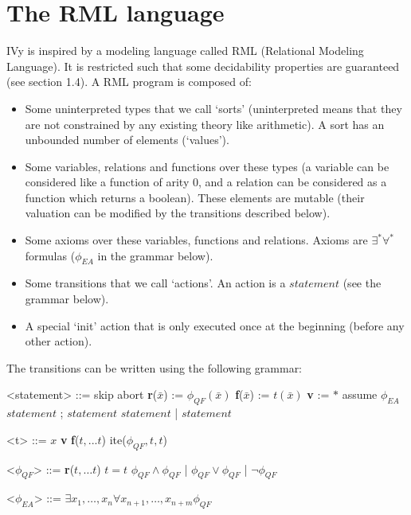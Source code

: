 \documentclass[11pt,a4paper,oldfontcommands]{memoir}
\begin{document}
    \section{The RML language}

    IVy is inspired by a modeling language called RML (Relational Modeling Language). It is restricted such that some decidability properties are guaranteed (see section 1.4).
    A RML program is composed of:
    \begin{itemize}
        \item Some uninterpreted types that we call `sorts' (uninterpreted means that they are not constrained by any existing theory like arithmetic). A sort has an unbounded number of elements (`values').
        \item Some variables, relations and functions over these types (a variable can be considered like a function of arity 0, and a relation can be considered as a function
        which returns a boolean). These elements are mutable (their valuation can be modified by the transitions described below).
        \item Some axioms over these variables, functions and relations. Axioms are \(\exists^*\forall^*\) formulas (\( \phi_{EA} \) in the grammar below).
        \item Some transitions that we call `actions'. An action is a \(statement\) (see the grammar below).
        \item A special `init' action that is only executed once at the beginning (before any other action).
    \end{itemize}

    The transitions can be written using the following grammar:
    \begin{multicols}{2}
        \begin{grammar}

            <statement> ::= skip
            \alt abort
            \alt \textbf{r}(\(\bar{x}\)) := \( \phi_{QF}(\bar{x}) \)
            \alt \textbf{f}(\(\bar{x}\)) := \( t(\bar{x}) \)
            \alt \textbf{v} := \( * \)
            \alt assume \( \phi_{EA} \)
            \alt \( statement \) ; \( statement \)
            \alt \( statement \) | \( statement \)
            
        \end{grammar}

        \columnbreak

        \begin{grammar}

            <t> ::= \(x\)
            \alt \textbf{v}
            \alt \textbf{f}(\(t,...t\))
            \alt ite(\( \phi_{QF},t,t\))

            <\( \phi_{QF} \)> ::= \textbf{r}(\(t,\ldots t\))
            \alt \( t = t \)
            \alt \( \phi_{QF} \land \phi_{QF} \) \quad | \quad \( \phi_{QF} \lor \phi_{QF} \) \quad | \quad \( \neg \phi_{QF} \)
            
            <\( \phi_{EA} \)> ::= \( \exists x_1,\ldots,x_n \forall x_{n+1},\ldots,x_{n+m} \phi_{QF} \)

        \end{grammar}
    \end{multicols}
\end{document}
